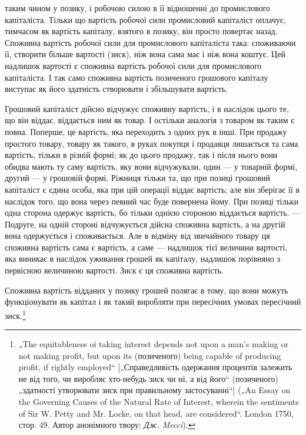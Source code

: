 \parcont{}  %
таким чином у позику, і робочою силою в її відношенні до промислового
капіталіста. Тільки що вартість робочої сили промисловий
капіталіст оплачує, тимчасом як вартість капіталу, взятого
в позику, він просто повертає назад. Споживна вартість робочої
сили для промислового капіталіста така: споживаючи її, створити
більше вартості (зиск), ніж вона сама має і ніж вона коштує.
Цей надлишок вартості є споживна вартість робочої сили для
промислового капіталіста. І так само споживна вартість позиченого
грошового капіталу виступає як його здатність створювати
і збільшувати вартість.

Грошовий капіталіст дійсно відчужує споживну вартість, і в наслідок
цього те, що він віддає, віддається ним як товар. І остільки
аналогія з товаром як таким є повна. Поперше, це вартість, яка
переходить з одних рук в інші. При продажу простого товару,
товару як такого, в руках покупця і продавця лишається та сама
вартість, тільки в різній формі; як до цього продажу, так і після
нього вони обидва мають ту саму вартість, яку вони відчужували,
один — у товарній формі, другий — у грошовій формі. Ріжниця
тільки та, що при позиці грошовий капіталіст є єдина особа, яка
при цій операції віддає вартість; але він зберігає її в наслідок того,
що вона через певний час буде повернена йому. При позиці тільки
одна сторона одержує вартість, бо тільки однією стороною віддається
вартість. — Подруге, на одній стороні відчужується дійсна
споживна вартість, а на другій вона одержується і споживається.
Але в відміну від звичайного товару ця споживна вартість сама є
вартість, а саме — надлишок тієї величини вартості, яка виникає
в наслідок уживання грошей як капіталу, надлишок порівняно з
первісною величиною вартості. Зиск є ця споживна вартість.

Споживна вартість відданих у позику грошей полягає в тому,
що вони можуть функціонувати як капітал і як такий виробляти
при пересічних умовах пересічний зиск.\footnote{
„The equitableness oi taking interest depends not upon a man’s making or
not making profit, but upon its (позиченого) being capable of producing profit, if
rightly employed“ [„Справедливість одержання процентів залежить не від того, чи
виробляє хто-небудь зиск чи ні, а від його“ (позиченого) „здатності утворювати
зиск при правильному застосуванні“] („An Essay on the Governing Causes of
the Natural Rate of Interest, wherein the sentiments of Sir W. Petty and
Mr. Locke, on that head, are considered“. London 1750, стор. 49. Автор анонімного
твору: \emph{Дж. Mecci}).
}

